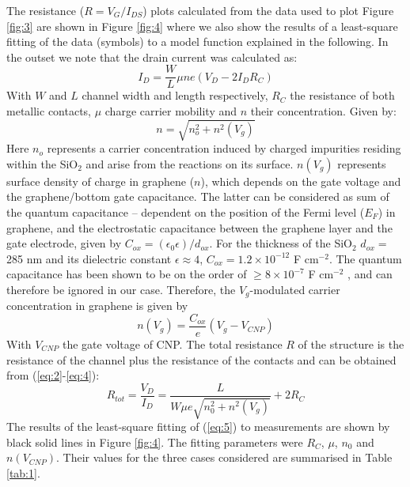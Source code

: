 \documentclass[preprint,aip,jap]{revtex4-2}
\begin{document}
The resistance ($R=V_{G}/I_{DS}$) plots calculated from the data used to plot Figure \ref{fig:3} are shown in Figure \ref{fig:4} where we also show the results of a least-square fitting of the data (symbols) to a model function explained in the following.
In the outset we note that the drain current was calculated as:
  \begin{equation}
    \label{eq:2}
    I_{D}=\frac{W}{L}\mu n e(V_{D}- 2I_{D}R_{C})
  \end{equation}
  \noindent With $W$ and $L$ channel width and length respectively, $R_{C}$ the resistance of both metallic contacts, $\mu$ charge carrier mobility and $n$ their concentration.
   Given by:
  \begin{equation}
    \label{eq:3}
    n=\sqrt{n_{o}^{2}+n^{2}(V_{g})}
  \end{equation}
 Here $n_o$ represents a carrier concentration induced by charged impurities residing within the SiO$_{2}$ and arise from the reactions on its surface\cite{adam-2007}.
 $n(V_{g})$ represents surface density of charge in graphene ($n$), which depends on the gate voltage and the graphene/bottom gate capacitance.
The latter can be considered as sum of  the quantum capacitance -- dependent on the position of the  Fermi level ($E_F$)  in  graphene, 
 and the electrostatic  capacitance between the graphene layer and the gate electrode, given by $C_{ox}=(\epsilon_0\epsilon)/d_{ox}$\cite{sze-2006}.
 For the thickness of the SiO$_{2}$ $d_{ox}=$285 nm and its dielectric constant  $\epsilon \approx 4$,  $C_{ox}=1.2\times10^{-12}$ F cm$^{-2}$.
 The quantum capacitance has been shown to be on the order of $ \geq 8 \times10^{-7}$ F cm$^{-2}$ \cite{xia_2009}, and can therefore be ignored in our case\cite{das-2008}. 
 Therefore, the $V_{g}$-modulated carrier concentration in graphene is given by
 \begin{equation}
   \label{eq:4}
   n(V_{g})= \frac{C_{ox}}{e}(V_{g}- V_{CNP})
 \end{equation}
 \noindent With $V_{CNP}$ the gate voltage of CNP\cite{xia-2010}.
 The total resistance $R$ of the structure is the resistance of the  channel plus the resistance of the contacts and can be  obtained from (\ref{eq:2}-\ref{eq:4}):	
 \begin{equation}
	 \label{eq:5}
     R_{tot} = \frac{V_{D}}{I_{D}} = \frac{L}{W\mu e\sqrt{n_{0}^{2}+n^{2}(V_{g})}} +2 R_{C}
 \end{equation}
 \noindent The results of the least-square fitting of (\ref{eq:5}) to measurements are shown by black solid lines in Figure \ref{fig:4}. The fitting parameters were $R_{C}$, $\mu$, $n_0$ and $n(V_{CNP})$.
 Their  values for the three cases considered are summarised in Table \ref{tab:1}.
\end{document}

